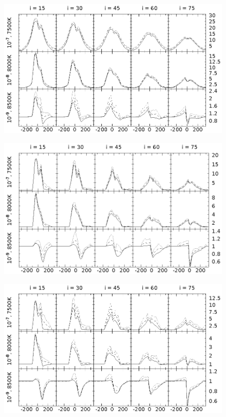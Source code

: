 \documentclass{article}
\begin{document}
\begin{figure}[h]
\centering
\includegraphics[width=\textwidth]{hot_5_Ha.eps}
\caption{\rm}
\label{fig:Ha}
\end{figure}
\begin{figure}[h]
\centering
\includegraphics[width=\textwidth]{hot_5_Hb.eps}
\caption{\rm}
\label{fig:Hb}
\end{figure}

\begin{figure}[h]
\centering
\includegraphics[width=\textwidth]{hot_5_Hg.eps}
\caption{\rm}
\label{fig:Hg}
\end{figure}
\end{document}
